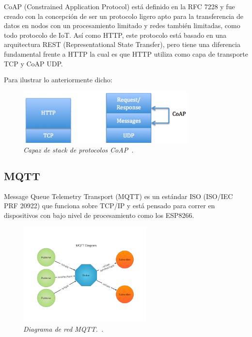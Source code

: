CoAP (Constrained Application Protocol) está definido en la RFC 7228 y fue creado con la concepción de ser un protocolo ligero apto para la transferencia de datos en nodos con un procesamiento limitado y redes también limitadas, como todo protocolo de IoT. Así como HTTP, este protocolo está basado en una arquitectura REST (Representational State Transfer), pero tiene una diferencia fundamental frente a HTTP la cual es que HTTP utiliza como capa de transporte TCP y CoAP UDP. 

Para ilustrar lo anteriormente dicho:

\begin{figure}[h!]
  \centering
  \includegraphics[width=0.8\textwidth, keepaspectratio]{images/http-coap}
  \caption{\textit{Capaz de stack de protocolos CoAP~\cite{HTTP_CoAP_img}.}}
  \label{fig:http_coap}
\end{figure}

\subsection{MQTT}

Message Queue Telemetry Transport (MQTT) es un estándar ISO (ISO/IEC PRF 20922) que funciona sobre TCP/IP y está pensado para correr en dispositivos con bajo nivel de procesamiento como los ESP8266. 

\begin{figure}[h!]
  \centering
  \includegraphics[width=0.6\textwidth, keepaspectratio]{images/mqtt-diagram}
  \caption{\textit{Diagrama de red MQTT.~\cite{MQTT_img}.}}
  \label{fig:mqtt-diag}
\end{figure}

